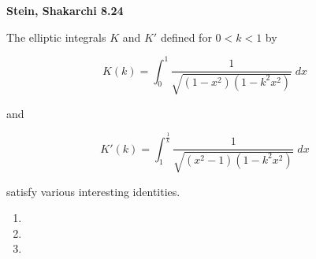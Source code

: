 \textbf{Stein, Shakarchi 8.24}

The elliptic integrals $K$ and $K'$ defined for $0 < k < 1$ by

$$
K(k) = \int_0^1 \frac{1}{\sqrt{\left(1 - x^2\right)\left(1 - k^2 x^2\right)}}\; dx
$$

and

$$
K'(k) = \int_1^{\frac{1}{k}} \frac{1}{\sqrt{\left(x^2 - 1\right)\left(1 - k^2 x^2\right)}}\; dx
$$

satisfy various interesting identities.

\begin{enumerate}
  \item 
  \pagebreak
  \item  
  \pagebreak
  \item 
\end{enumerate}
